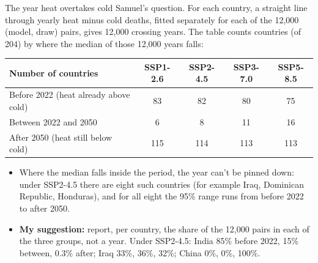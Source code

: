 \documentclass[aspectratio=169,11pt]{beamer}
\begin{document}
\begin{frame}{The year heat overtakes cold}
  \small
  Samuel's question. For each country, a straight line through yearly heat minus cold deaths, fitted separately for each of the 12,000 (model, draw) pairs, gives 12,000 crossing years. The table counts countries (of 204) by where the median of those 12,000 years falls:

  \medskip
  \centering
  \begin{tabular}{lcccc}
    \toprule
    Number of countries & SSP1-2.6 & SSP2-4.5 & SSP3-7.0 & SSP5-8.5 \\
    \midrule
    Before 2022 (heat already above cold) & 83 & 82 & 80 & 75 \\
    Between 2022 and 2050   & 6  & 8  & 11 & 16 \\
    After 2050 (heat still below cold)    & 115 & 114 & 113 & 113 \\
    \bottomrule
  \end{tabular}

  \medskip
  \raggedright\footnotesize
  \begin{itemize}
    \item Where the median falls inside the period, the year can't be pinned down: under SSP2-4.5 there are eight such countries (for example Iraq, Dominican Republic, Honduras), and for all eight the 95\% range runs from before 2022 to after 2050.
    \item \textbf{My suggestion:} report, per country, the share of the 12,000 pairs in each of the three groups, not a year. Under SSP2-4.5: India 85\% before 2022, 15\% between, 0.3\% after; Iraq 33\%, 36\%, 32\%; China 0\%, 0\%, 100\%.
  \end{itemize}
\end{frame}
\end{document}
